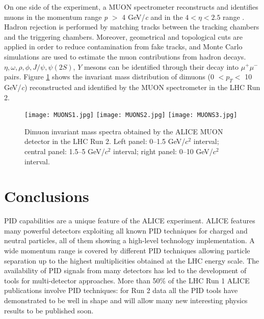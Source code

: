 \documentclass[10pt]{article}
\begin{document}
On one side of the experiment, a MUON spectrometer reconstructs and identifies muons in the momentum range {\it p} $>$ 4 GeV/{\it c} and in the $4 < \eta <2.5$ range \cite{ref:perf}. Hadron rejection is performed by matching tracks between the tracking chambers and the triggering chambers. Moreover, geometrical and topological cuts are applied in order to reduce contamination from fake tracks, and Monte Carlo simulations are used to estimate the muon contributions from hadron decays. $\eta, \omega,\rho,\phi, J/\psi, \psi(2S)$, $Y$ mesons can be identified through their decay into $\mu^{+} \mu^{-}$ pairs.  
Figure \ref{fig:fig6} shows the invariant mass distribution of dimuons (0 $<p_{T} <$ 10 GeV/{\it c}) reconstructed and identified by the MUON spectrometer in the LHC Run 2. 
 \begin{figure}[h]
\centering
\texttt{[image: MUONS1.jpg]}
\hspace{2mm}
\texttt{[image: MUONS2.jpg]}
\hspace{2mm}
\texttt{[image: MUONS3.jpg]}
\hspace{2mm}
\caption{
Dimuon invariant mass spectra obtained by the ALICE MUON detector in the LHC Run 2. Left panel: 0--1.5 GeV/$c^{2}$ interval; central panel: 1.5--5 GeV/$c^{2}$ interval; right panel: 0--10 GeV/$c^{2}$ interval.}

\label{fig:fig6}
\end{figure}

\vspace{-6mm}
\section{Conclusions}
PID capabilities are a unique feature of the ALICE experiment.
ALICE features many powerful detectors exploiting all known PID techniques for charged and neutral particles, all of them showing a high-level technology implementation. 
A wide momentum range is covered by different PID techniques allowing particle separation up to the highest multiplicities obtained at the LHC energy scale. 
The availability of PID signals from many detectors has led to the development of tools for multi-detector approaches. 
More than 50$\%$ of the LHC Run 1 ALICE publications involve PID techniques: for Run 2 data all the PID tools have demonstrated to be well in shape and will allow many new interesting physics results to be published soon.
\end{document}

